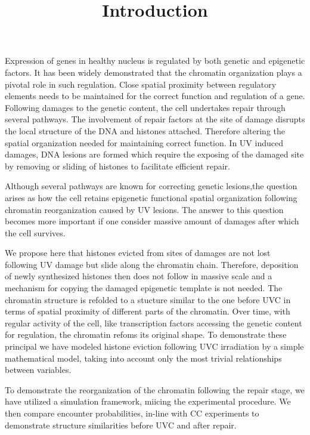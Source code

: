 \documentclass[12pt]{article}
\begin{document}
	
	\title{Introduction}
	\maketitle
	 Expression of genes in healthy nucleus is regulated by both genetic and epigenetic  factors. It has been widely demonstrated that the chromatin organization plays a pivotal role in such regulation. Close spatial proximity between regulatory elements needs to be maintained for the correct function and regulation of a gene.  
	 Following damages to the genetic content, the cell undertakes repair through several pathways. The involvement of repair factors at the site of damage disrupts the local structure of the DNA and histones attached. Therefore altering the spatial organization needed for maintaining correct function. In UV induced damages, DNA lesions are formed which require the exposing of the damaged site by removing or sliding of histones to facilitate efficient repair. 
	 
	Although several pathways are known for correcting genetic lesions,the question arises as how the cell retains epigenetic functional spatial organization following chromatin reorganization caused by UV lesions. The answer to this question becomes more important if one consider massive amount of damages after which the cell survives. 
	
	We propose here that histones evicted from sites of damages are not lost following UV damage but slide along the chromatin chain. Therefore, deposition of newly synthesized histones then does not follow in massive scale and a mechanism for copying the damaged epigenetic template is not needed. The chromatin structure is refolded to a stucture similar to the one before UVC in terms of spatial proximity of different parts of the chromatin. Over time, with regular activity of the cell, like transcription factors accessing the genetic content for regulation, the chromatin refoms its original shape.  
	To demonstrate these principal we have modeled histone eviction following UVC irradiation by a simple mathematical model, taking into account only the most trivial relationships between variables.
		
	 To demonstrate the reorganization of the chromatin following the repair stage, we have utilized a simulation framework, miicing the experimental procedure. We then compare encounter probabilities, in-line with CC experiments to demonstrate structure similarities before UVC and after repair. 			
	
\end{document}
